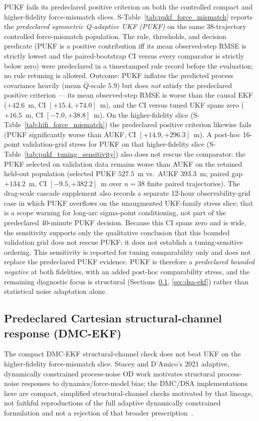 \documentclass{article}
\begin{document}
PUKF fails its predeclared positive criterion on both the controlled compact and higher-fidelity force-mismatch slices.
S-Table~\ref{tab:pukf_force_mismatch} reports the \emph{predeclared symmetric Q-adaptive UKF (PUKF)} on the same 38-trajectory controlled force-mismatch population. The rule, thresholds, and decision predicate (PUKF is a positive contribution iff its mean observed-step RMSE is strictly lowest and the paired-bootstrap CI versus every comparator is strictly below zero) were predeclared in a timestamped rule record before the evaluation; no rule retuning is allowed. Outcome: PUKF inflates the predicted process covariance heavily (mean $\bar Q$-scale $5.9$) but does \emph{not} satisfy the predeclared positive criterion --- its mean observed-step RMSE is worse than the causal EKF ($+42.6$~m, CI $[+15.4,+74.0]$~m), and the CI versus tuned UKF spans zero ($+16.5$~m, CI $[-7.0,+38.8]$~m). On the higher-fidelity slice (S-Table~\ref{tab:hifi_force_mismatch}) the predeclared positive criterion likewise fails (PUKF significantly worse than AUKF, CI $[+14.9,+296.3]$~m). A post-hoc 16-point validation-grid stress for PUKF on that higher-fidelity slice (S-Table~\ref{tab:pukf_tuning_sensitivity}) also does not rescue the comparator: the PUKF selected on validation data remains worse than AUKF on the retained held-out population (selected PUKF $527.5$~m vs.\ AUKF $393.3$~m; paired gap $+134.2$~m, CI $[-9.5,+382.2]$~m over $n=38$ finite paired trajectories). The drag-scale cascade supplement also records a separate 12-hour observability-grid case in which PUKF overflows on the unaugmented UKF-family stress slice; that is a scope warning for long-arc sigma-point conditioning, not part of the predeclared 40-minute PUKF decision. Because this CI spans zero and is wide, the sensitivity supports only the qualitative conclusion that this bounded validation grid does not rescue PUKF; it does not establish a tuning-sensitive ordering. This sensitivity is reported for tuning comparability only and does not replace the predeclared PUKF evidence. PUKF is therefore a \emph{predeclared bounded negative} at both fidelities, with an added post-hoc comparability stress, and the remaining diagnostic focus is structural (Sections~\ref{sec:dmc-ekf}, \ref{sec:dsa-ekf}) rather than statistical noise adaptation alone.

\subsection{Predeclared Cartesian structural-channel response (DMC-EKF)}\label{sec:dmc-ekf}
The compact DMC-EKF structural-channel check does not beat UKF on the higher-fidelity force-mismatch slice.
Stacey and D'Amico's 2021 adaptive, dynamically constrained process-noise OD work motivates structural process-noise responses to dynamics/force-model bias; the DMC/DSA implementations here are compact, simplified structural-channel checks motivated by that lineage, not faithful reproductions of the full adaptive dynamically constrained formulation and not a rejection of that broader prescription~\cite{stacey2021adaptive}.
\end{document}
